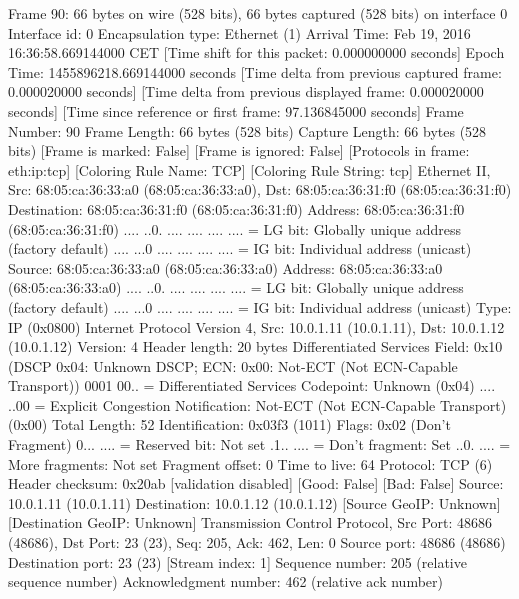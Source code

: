Frame 90: 66 bytes on wire (528 bits), 66 bytes captured (528 bits) on interface 0
    Interface id: 0
    Encapsulation type: Ethernet (1)
    Arrival Time: Feb 19, 2016 16:36:58.669144000 CET
    [Time shift for this packet: 0.000000000 seconds]
    Epoch Time: 1455896218.669144000 seconds
    [Time delta from previous captured frame: 0.000020000 seconds]
    [Time delta from previous displayed frame: 0.000020000 seconds]
    [Time since reference or first frame: 97.136845000 seconds]
    Frame Number: 90
    Frame Length: 66 bytes (528 bits)
    Capture Length: 66 bytes (528 bits)
    [Frame is marked: False]
    [Frame is ignored: False]
    [Protocols in frame: eth:ip:tcp]
    [Coloring Rule Name: TCP]
    [Coloring Rule String: tcp]
Ethernet II, Src: 68:05:ca:36:33:a0 (68:05:ca:36:33:a0), Dst: 68:05:ca:36:31:f0 (68:05:ca:36:31:f0)
    Destination: 68:05:ca:36:31:f0 (68:05:ca:36:31:f0)
        Address: 68:05:ca:36:31:f0 (68:05:ca:36:31:f0)
        .... ..0. .... .... .... .... = LG bit: Globally unique address (factory default)
        .... ...0 .... .... .... .... = IG bit: Individual address (unicast)
    Source: 68:05:ca:36:33:a0 (68:05:ca:36:33:a0)
        Address: 68:05:ca:36:33:a0 (68:05:ca:36:33:a0)
        .... ..0. .... .... .... .... = LG bit: Globally unique address (factory default)
        .... ...0 .... .... .... .... = IG bit: Individual address (unicast)
    Type: IP (0x0800)
Internet Protocol Version 4, Src: 10.0.1.11 (10.0.1.11), Dst: 10.0.1.12 (10.0.1.12)
    Version: 4
    Header length: 20 bytes
    Differentiated Services Field: 0x10 (DSCP 0x04: Unknown DSCP; ECN: 0x00: Not-ECT (Not ECN-Capable Transport))
        0001 00.. = Differentiated Services Codepoint: Unknown (0x04)
        .... ..00 = Explicit Congestion Notification: Not-ECT (Not ECN-Capable Transport) (0x00)
    Total Length: 52
    Identification: 0x03f3 (1011)
    Flags: 0x02 (Don't Fragment)
        0... .... = Reserved bit: Not set
        .1.. .... = Don't fragment: Set
        ..0. .... = More fragments: Not set
    Fragment offset: 0
    Time to live: 64
    Protocol: TCP (6)
    Header checksum: 0x20ab [validation disabled]
        [Good: False]
        [Bad: False]
    Source: 10.0.1.11 (10.0.1.11)
    Destination: 10.0.1.12 (10.0.1.12)
    [Source GeoIP: Unknown]
    [Destination GeoIP: Unknown]
Transmission Control Protocol, Src Port: 48686 (48686), Dst Port: 23 (23), Seq: 205, Ack: 462, Len: 0
    Source port: 48686 (48686)
    Destination port: 23 (23)
    [Stream index: 1]
    Sequence number: 205    (relative sequence number)
    Acknowledgment number: 462    (relative ack number)
